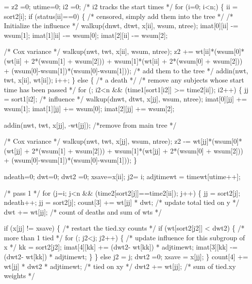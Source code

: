 \documentclass{article}
\begin{document}
\begin{nwchunk}
=
 z2 =0; utime=0; i2 =0;  /* i2 tracks the start times */
 for (i=0; i<n;) \{
     ii = sort2[i];  
     if (status[ii]==0) \{ /* censored, simply add them into the tree */
         /* Initialize the influence */
         walkup(dnwt, dtwt, x[ii], wsum, ntree);
         imat[0][ii] -= wsum[1];
         imat[1][ii] -= wsum[0];
         imat[2][ii] -= wsum[2];
         
         /* Cox variance */
         walkup(nwt, twt, x[ii], wsum, ntree);
         z2 += wt[ii]*(wsum[0]*(wt[ii] + 2*(wsum[1] + wsum[2])) +
                       wsum[1]*(wt[ii] + 2*(wsum[0] + wsum[2])) +
                       (wsum[0]-wsum[1])*(wsum[0]-wsum[1]));
         /* add them to the tree */
         addin(nwt, twt, x[ii], wt[ii]);
         i++;
     \}
     else \{  /* a death */
         /* remove any subjects whose start time has been passed */
         for (; i2<n && (time1[sort1[i2]] >= time2[ii]); i2++) \{
             jj = sort1[i2];
             /* influence */
             walkup(dnwt, dtwt, x[jj], wsum, ntree);
             imat[0][jj] += wsum[1];
             imat[1][jj] += wsum[0];
             imat[2][jj] += wsum[2];
 
             addin(nwt, twt, x[jj], -wt[jj]);  /*remove from main tree */
 
             /* Cox variance */
             walkup(nwt, twt, x[jj], wsum, ntree);
             z2 -= wt[jj]*(wsum[0]*(wt[jj] + 2*(wsum[1] + wsum[2])) +
                           wsum[1]*(wt[jj] + 2*(wsum[0] + wsum[2])) +
                           (wsum[0]-wsum[1])*(wsum[0]-wsum[1]));
         \}
 
         ndeath=0; dwt=0; 
         dwt2 =0; xsave=x[ii]; j2= i;
         adjtimewt = timewt[utime++];
 
         /* pass 1 */
         for (j=i; j<n && (time2[sort2[j]]==time2[ii]); j++) \{
             jj = sort2[j];
             ndeath++; 
             jj = sort2[j];
             count[3] += wt[jj] * dwt;  /* update total tied on y */
             dwt += wt[jj];   /* count of deaths and sum of wts */
 
             if (x[jj] != xsave) \{  /* restart the tied.xy counts */
                 if (wt[sort2[j2]] < dwt2) \{ /* more than 1 tied */
                     for (; j2<j; j2++) \{
                         /* update influence for this subgroup of x */
                         kk = sort2[j2];
                         imat[4][kk] += (dwt2- wt[kk]) * adjtimewt;
                         imat[3][kk] -= (dwt2- wt[kk]) * adjtimewt;
                     \}
                 \} else j2 = j;
                 dwt2 =0;
                 xsave = x[jj];
             \}
             count[4] += wt[jj] * dwt2 * adjtimewt; /* tied on xy */
             dwt2 += wt[jj]; /* sum of tied.xy weights */
 

\end{nwchunk}
\end{document}
